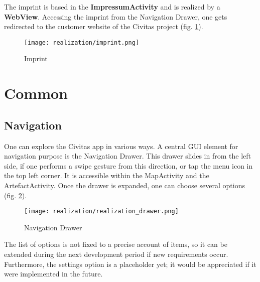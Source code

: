 The imprint is based in the \textbf{ImpressumActivity} and is realized by a \textbf{WebView}. Accessing the imprint from the Navigation Drawer, one gets redirected to the customer website of the Civitas project (fig. \ref{fig:imprint}).

\begin{figure}[H]
\centering
{}
  \texttt{[image: realization/imprint.png]}
  \caption[Imprint]{Imprint}
  \label{fig:imprint}
\endminipage\hfill
\end{figure}

\section{Common}

\subsection{Navigation}
One can explore the Civitas app in various ways. A central GUI element for navigation purpose is the Navigation Drawer. This drawer slides in from the left side, if one performs a swipe gesture from this direction, or tap the menu icon in the top left corner. It is accessible within the MapActivity and the ArtefactActivity. Once the drawer is expanded, one can choose several options (fig. \ref{fig:realization_drawer}).

\begin{figure}[H]
\centering
{}
  \texttt{[image: realization/realization\_drawer.png]}
  \caption{Navigation Drawer}\label{fig:realization_drawer}
\endminipage\hfill
\end{figure}

The list of options is not fixed to a precise account of items, so it can be extended during the next development period if new requirements occur. Furthermore, the settings option is a placeholder yet; it would be appreciated if it were implemented in the future.



